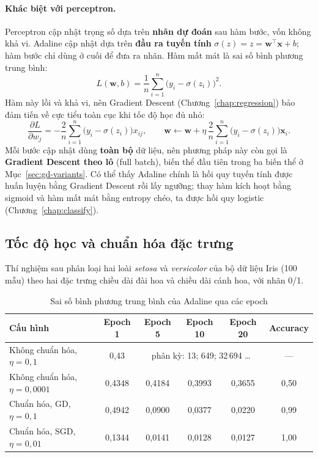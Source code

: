 \paragraph{Khác biệt với perceptron.} Perceptron cập nhật trọng số dựa trên \textbf{nhãn dự đoán} sau hàm bước, vốn không khả vi. Adaline cập nhật dựa trên \textbf{đầu ra tuyến tính} $\sigma(z) = z = \mathbf{w}^\top\mathbf{x} + b$; hàm bước chỉ dùng ở cuối để đưa ra nhãn. Hàm mất mát là sai số bình phương trung bình:
\begin{equation}
    L(\mathbf{w}, b) = \frac{1}{n}\sum_{i=1}^{n}\big(y_i - \sigma(z_i)\big)^2 .
\end{equation}
Hàm này lồi và khả vi, nên Gradient Descent (Chương~\ref{chap:regression}) bảo đảm tiến về cực tiểu toàn cục khi tốc độ học đủ nhỏ:
\begin{equation}
    \frac{\partial L}{\partial w_j} = -\frac{2}{n}\sum_{i=1}^{n}\big(y_i - \sigma(z_i)\big)x_{ij}, \qquad
    \mathbf{w} \leftarrow \mathbf{w} + \eta\,\frac{2}{n}\sum_{i=1}^{n}\big(y_i - \sigma(z_i)\big)\mathbf{x}_i .
\end{equation}
Mỗi bước cập nhật dùng \textbf{toàn bộ} dữ liệu, nên phương pháp này còn gọi là \textbf{Gradient Descent theo lô} (full batch), biến thể đầu tiên trong ba biến thể ở Mục~\ref{sec:gd-variants}. Có thể thấy Adaline chính là hồi quy tuyến tính được huấn luyện bằng Gradient Descent rồi lấy ngưỡng; thay hàm kích hoạt bằng sigmoid và hàm mất mát bằng entropy chéo, ta được hồi quy logistic (Chương~\ref{chap:classify}).

\subsection{Tốc độ học và chuẩn hóa đặc trưng}

Thí nghiệm sau phân loại hai loài \textit{setosa} và \textit{versicolor} của bộ dữ liệu Iris (100 mẫu) theo hai đặc trưng chiều dài đài hoa và chiều dài cánh hoa, với nhãn 0/1.

\begin{table}[H]
\centering
\begin{tabular}{|l|c|c|c|c|c|}
\hline
\textbf{Cấu hình} & \textbf{Epoch 1} & \textbf{Epoch 5} & \textbf{Epoch 10} & \textbf{Epoch 20} & \textbf{Accuracy} \\
\hline
Không chuẩn hóa, $\eta = 0{,}1$ & 0,43 & \multicolumn{3}{c|}{phân kỳ: 13; 649; 32\,694 \ldots} & --- \\ \hline
Không chuẩn hóa, $\eta = 0{,}0001$ & 0,4348 & 0,4184 & 0,3993 & 0,3655 & 0,50 \\ \hline
Chuẩn hóa, GD, $\eta = 0{,}1$ & 0,4942 & 0,0900 & 0,0377 & 0,0220 & 0,99 \\ \hline
Chuẩn hóa, SGD, $\eta = 0{,}01$ & 0,1344 & 0,0141 & 0,0128 & 0,0127 & 1,00 \\ \hline
\end{tabular}
\caption{Sai số bình phương trung bình của Adaline qua các epoch}
\label{tab:adaline}
\end{table}

